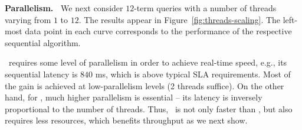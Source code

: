 {{%
{\bf Parallelism.\ } 
We next consider  $12$-term queries with a number of threads varying from $1$ to $12$. 
The results appear in Figure~\ref{fig:threads-scaling}.  
The left-most data point in each curve corresponds to the performance of 
the respective sequential algorithm.

\alg\ requires some level of parallelism in order to achieve real-time speed, e.g., its sequential
latency 
is $840$ ms, which is  above typical SLA requirements. Most of the gain is achieved at low-parallelism levels (2 threads suffice). 
On the other hand, for \pBMW, much higher parallelism is essential -- its latency is inversely proportional to the number of threads. Thus, \alg\ is not only faster 
than \pBMW, but also requires less resources, which benefits throughput as we next show.

}}
